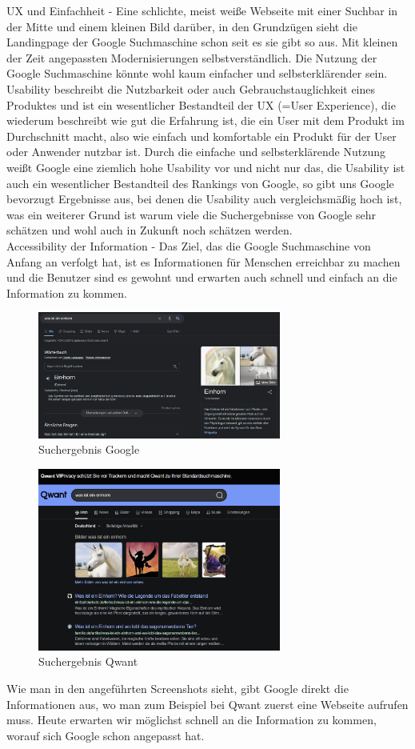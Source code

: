 UX und Einfachheit - Eine schlichte, meist weiße Webseite mit einer Suchbar in der Mitte und einem kleinen Bild darüber,
in den Grundzügen sieht die Landingpage der Google Suchmaschine schon seit es sie gibt so aus.
Mit kleinen der Zeit angepassten Modernisierungen selbstverständlich.
Die Nutzung der Google Suchmaschine könnte wohl kaum einfacher und selbsterklärender sein.
Usability beschreibt die Nutzbarkeit oder auch Gebrauchstauglichkeit eines Produktes und ist ein wesentlicher Bestandteil der UX (=User Experience),
die wiederum beschreibt wie gut die Erfahrung ist, die ein User mit dem Produkt im Durchschnitt macht, also wie einfach und komfortable ein Produkt für der User oder Anwender nutzbar ist.\autocite{Maulhardt4}
Durch die einfache und selbsterklärende Nutzung weißt Google eine ziemlich hohe Usability vor und nicht nur das,
die Usability ist auch ein wesentlicher Bestandteil des Rankings von Google, so gibt uns Google bevorzugt Ergebnisse aus, bei denen die Usability auch vergleichsmäßig hoch ist,
was ein weiterer Grund ist warum viele die Suchergebnisse von Google sehr schätzen und wohl auch in Zukunft noch schätzen werden.\autocite{LIC15}\\

Accessibility der Information - Das Ziel, das die Google Suchmaschine von Anfang an verfolgt hat,
ist es Informationen für Menschen erreichbar zu machen und die Benutzer sind es gewohnt und erwarten auch schnell und einfach an die Information zu kommen.
\begin{figure}[h]
    \centering
    \includegraphics[width=80mm]{images/screenshot_googleQue}
    \caption{Suchergebnis Google}
    \label{fig:screenshotGoogleQue}
\end{figure}
\begin{figure}[h]
    \centering
    \includegraphics[width=80mm]{images/screenshot_qwantQue}
    \caption{Suchergebnis Qwant}
    \label{fig:screenshotQwantQue}
\end{figure}
Wie man in den angeführten Screenshots sieht, gibt Google direkt die Informationen aus, wo man zum Beispiel bei Qwant zuerst eine Webseite aufrufen muss.
Heute erwarten wir möglichst schnell an die Information zu kommen, worauf sich Google schon angepasst hat.